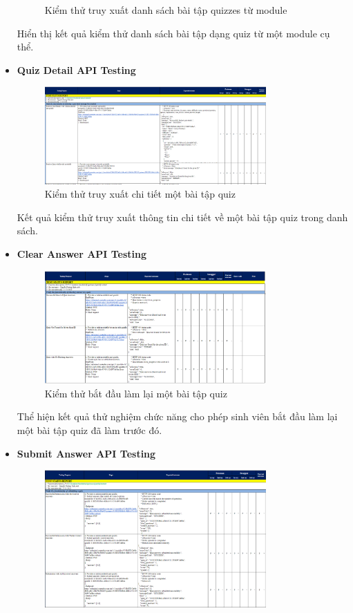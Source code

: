 \begin{itemize}
\begin{figure}[H]
        \caption{Kiểm thử truy xuất danh sách bài tập quizzes từ module}
    \end{figure}
    Hiển thị kết quả kiểm thử danh sách bài tập dạng quiz từ một module cụ thể.
    \item \textbf{Quiz Detail API Testing}
    \begin{figure}[H]
        \centering
        \includegraphics[width=0.8\textwidth]{Images/test/test_DQ.png}
        \caption{Kiểm thử truy xuất chi tiết một bài tập quiz}
    \end{figure}
    Kết quả kiểm thử truy xuất thông tin chi tiết về một bài tập quiz trong danh sách.
    \item \textbf{Clear Answer API Testing}
    \begin{figure}[H]
        \centering
        \includegraphics[width=0.8\textwidth]{Images/test/test_CA.png}
        \caption{Kiểm thử bắt đầu làm lại một bài tập quiz}
    \end{figure}
    Thể hiện kết quả thử nghiệm chức năng cho phép sinh viên bắt đầu làm lại một bài tập quiz đã làm trước đó.
    \item \textbf{Submit Answer API Testing}
    \begin{figure}[H]
        \centering
        \includegraphics[width=0.8\textwidth]{Images/test/test_SA.png}

\end{figure}
\end{itemize}
